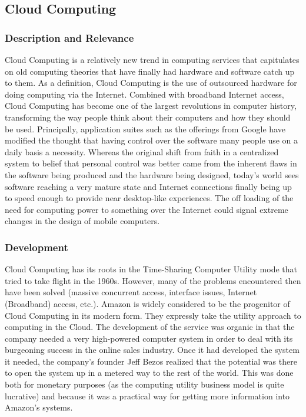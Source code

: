 \documentclass[12pt,oneside,letterpaper,titlepage]{article}
\begin{document}
\subsection{Cloud Computing}

\subsubsection{Description and Relevance}

Cloud Computing is a relatively new trend in computing services that capitulates
on old computing theories that have finally had hardware and software catch up
to them.  As a definition, Cloud Computing is the use of outsourced hardware for
doing computing via the Internet.  Combined with broadband Internet access,
Cloud Computing has become one of the largest revolutions in computer history,
transforming the way people think about their computers and how they should be
used.  Principally, application suites such as the offerings from Google have
modified the thought that having control over the software many people use on a
daily basis a necessity.  Whereas the original shift from faith in a centralized
system to belief that personal control was better came from the inherent flaws
in the software being produced and the hardware being designed, today's world
sees software reaching a very mature state and Internet connections finally
being up to speed enough to provide near desktop-like experiences.  The off
loading of the need for computing power to something over the Internet could
signal extreme changes in the design of mobile computers.

\subsubsection{Development}

Cloud Computing has its roots in the Time-Sharing Computer Utility mode that
tried to take flight in the 1960s.  However, many of the problems encountered
then have been solved (massive concurrent access, interface issues, Internet
(Broadband) access, etc.).  Amazon is widely considered to be the progenitor of
Cloud Computing in its modern form.  They expressly take the utility approach to
computing in the Cloud.  The development of the service was organic in that the
company needed a very high-powered computer system in order to deal with its
burgeoning success in the online sales industry.  Once it had developed the
system it needed, the company's founder Jeff Bezos realized that the potential
was there to open the system up in a metered way to the rest of the world.  This
was done both for monetary purposes (as the computing utility business model is
quite lucrative) and because it was a practical way for getting more information
into Amazon's systems.
\end{document}
